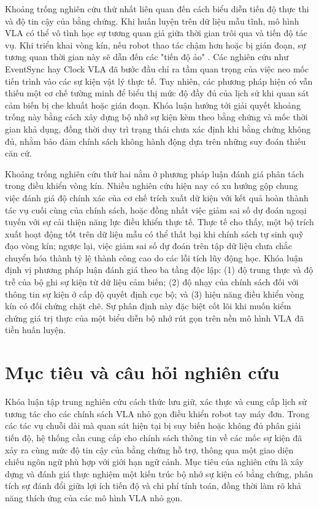 Khoảng trống nghiên cứu thứ nhất liên quan đến cách biểu diễn tiến độ thực thi và độ tin cậy của bằng chứng. Khi huấn luyện trên dữ liệu mẫu tĩnh, mô hình VLA có thể vô tình học sự tương quan giả giữa thời gian trôi qua và tiến độ tác vụ. Khi triển khai vòng kín, nếu robot thao tác chậm hơn hoặc bị gián đoạn, sự tương quan thời gian này sẽ dẫn đến các "tiến độ ảo" \cite{clockvla2026}. Các nghiên cứu như EventSync \cite{eventsync2026} hay Clock VLA \cite{clockvla2026} đã bước đầu chỉ ra tầm quan trọng của việc neo mốc tiến trình vào các sự kiện vật lý thực tế. Tuy nhiên, các phương pháp hiện có vẫn thiếu một cơ chế tường minh để biểu thị mức độ đầy đủ của lịch sử khi quan sát cảm biến bị che khuất hoặc gián đoạn. Khóa luận hướng tới giải quyết khoảng trống này bằng cách xây dựng bộ nhớ sự kiện kèm theo bằng chứng và mốc thời gian khả dụng, đồng thời duy trì trạng thái chưa xác định khi bằng chứng không đủ, nhằm bảo đảm chính sách không hành động dựa trên những suy đoán thiếu căn cứ.

Khoảng trống nghiên cứu thứ hai nằm ở phương pháp luận đánh giá phân tách trong điều khiển vòng kín. Nhiều nghiên cứu hiện nay có xu hướng gộp chung việc đánh giá độ chính xác của cơ chế trích xuất dữ kiện với kết quả hoàn thành tác vụ cuối cùng của chính sách, hoặc đồng nhất việc giảm sai số dự đoán ngoại tuyến với sự cải thiện năng lực điều khiển thực tế. Thực tế cho thấy, một bộ trích xuất hoạt động tốt trên dữ liệu mẫu có thể thất bại khi chính sách tự sinh quỹ đạo vòng kín; ngược lại, việc giảm sai số dự đoán trên tập dữ liệu chưa chắc chuyển hóa thành tỷ lệ thành công cao do các lỗi tích lũy động học. Khóa luận định vị phương pháp luận đánh giá theo ba tầng độc lập: (1) độ trung thực và độ trễ của bộ ghi sự kiện từ dữ liệu cảm biến; (2) độ nhạy của chính sách đối với thông tin sự kiện ở cấp độ quyết định cục bộ; và (3) hiệu năng điều khiển vòng kín có đối chứng chặt chẽ. Sự phân định này đặc biệt cốt lõi khi muốn kiểm chứng giá trị thực của một biểu diễn bộ nhớ rút gọn trên nền mô hình VLA đã tiền huấn luyện.

\section{Mục tiêu và câu hỏi nghiên cứu}

Khóa luận tập trung nghiên cứu cách thức lưu giữ, xác thực và cung cấp lịch sử tương tác cho các chính sách VLA nhỏ gọn điều khiển robot tay máy đơn. Trong các tác vụ chuỗi dài mà quan sát hiện tại bị suy biến hoặc không đủ phân giải tiến độ, hệ thống cần cung cấp cho chính sách thông tin về các mốc sự kiện đã xảy ra cùng mức độ tin cậy của bằng chứng hỗ trợ, thông qua một giao diện chiếu ngôn ngữ phù hợp với giới hạn ngữ cảnh. Mục tiêu của nghiên cứu là xây dựng và đánh giá thực nghiệm một kiến trúc bộ nhớ sự kiện có bằng chứng, phân tích sự đánh đổi giữa lợi ích tiến độ và chi phí tính toán, đồng thời làm rõ khả năng thích ứng của các mô hình VLA nhỏ gọn.

